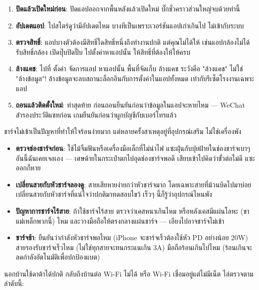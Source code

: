 \begin{enumerate}
  \item \textbf{ปิดแล้วเปิดใหม่ก่อน}: ปัดแอปออกจากพื้นหลังแล้วเปิดใหม่ บั๊กชั่วคราวส่วนใหญ่จบด้วยท่านี้
  \item \textbf{อัปเดตแอป}: ไปสโตร์ดูว่ามีอัปเดตไหม บางทีเป็นเพราะเวอร์ชันแอปเก่าเกินไป ไม่เข้ากับระบบ
  \item \textbf{ตรวจสิทธิ์}: แอปบางตัวต้องมีสิทธิ์ใดสิทธิ์หนึ่งถึงทำงานปกติ แต่คุณไม่ได้ให้ เช่นแอปกล้องไม่ได้รับสิทธิ์กล้อง เปิดปุ๊บปิดปั๊บ ไปตั้งค่าหาแอปนั้น ให้สิทธิ์ที่ต้องให้ให้ครบ
  \item \textbf{ล้างแคช}: ไปที่ ตั้งค่า จัดการแอป หาแอปนั้น พื้นที่จัดเก็บ ล้างแคช ระวังคือ "ล้างแคช" ไม่ใช่ "ล้างข้อมูล"! ล้างข้อมูลจะลบสถานะล็อกอินกับการตั้งค่าในแอปทั้งหมด เท่ากับรีเซ็ตโรงงานเฉพาะแอป
  \item \textbf{ถอนแล้วติดตั้งใหม่}: ท่าสุดท้าย ก่อนถอนยืนยันก่อนว่าข้อมูลในแอปจะหายไหม — WeChat สำรองประวัติแชทก่อน เกมยืนยันก่อนว่าผูกบัญชีกับเบอร์โทรแล้ว
\end{enumerate}


ชาร์จไม่เข้าเป็นปัญหาที่ทำให้ใจร้อนง่ายมาก แต่หลายครั้งสาเหตุอยู่ที่อุปกรณ์เสริม ไม่ใช่เครื่องพัง

\begin{itemize}
  \item \textbf{ตรวจช่องชาร์จก่อน}: ใช้ไม้จิ้มฟันหรือเครื่องมือเล็กที่ไม่นำไฟ แซะฝุ่นกับปุยฝ้ายในช่องชาร์จเบาๆ อันนี้ฉันเคยเจอเอง — เศษด้ายในกระเป๋าตกไปอุดช่องชาร์จพอดี เสียบเข้าไปคิดว่าขั้วต่อไม่ดี แซะออกก็หาย
  \item \textbf{เปลี่ยนสายกับหัวชาร์จลองดู}: สายเสียหายง่ายกว่าหัวชาร์จมาก โดยเฉพาะสายที่ม้วนบิดไปมาบ่อย เปลี่ยนสายกับหัวชาร์จที่แน่ใจว่าปกติมาทดสอบไขว้ เร็วๆ นี้ก็รู้ว่าอุปกรณ์ไหนพัง
  \item \textbf{ปัญหาการชาร์จไร้สาย}: ถ้าใช้ชาร์จไร้สาย ตรวจว่าเคสหนาเกินไหม หรือหลังเคสมีแผ่นโลหะ (ขาแม่เหล็กพวกนี้) ไหม และวางมือถือให้ตรงกลางแผ่นชาร์จ — เอียงไปอาจชาร์จไม่เข้า
  \item \textbf{ชาร์จช้า}: ยืนยันว่ากำลังหัวชาร์จพอไหม (iPhone จะชาร์จเร็วต้องใช้หัว PD อย่างน้อย 20W) สายรองรับชาร์จเร็วไหม (ไม่ใช่ทุกสายจะทนกระแนเกิน 3A) มือถือร้อนเกินไปไหม (ร้อนเกินจะลดกำลังอัตโนมัติเพื่อปกป้องแบต)
\end{itemize}


นอกบ้านใช้ดาต้าได้ปกติ กลับถึงบ้านต่อ Wi-Fi ไม่ได้ หรือ Wi-Fi เชื่อมอยู่แต่ไม่มีเน็ต ไล่ตรวจตามลำดับนี้:

